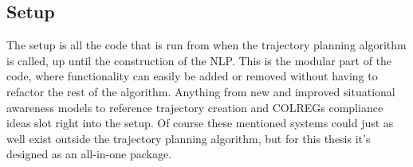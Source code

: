 \subsection{Setup}

The setup is all the code that is run from when the trajectory planning algorithm is called, up until the construction of the \gls{NLP}.
This is the modular part of the code, where functionality can easily be added or removed without having to refactor
the rest of the algorithm. Anything from new and improved situational awareness models to reference trajectory creation and
COLREGs compliance ideas slot right into the setup. Of course these mentioned systems could just as well exist outside the
trajectory planning algorithm, but for this thesis it's designed as an all-in-one package.

